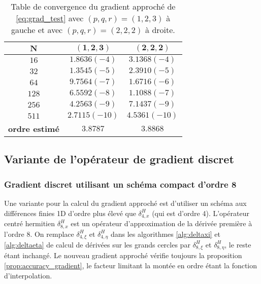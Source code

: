 \begin{table}[htbp]
\begin{center}
\begin{tabular}{|c||c|c|}
\hline
$\mathbf{N}$    & $\mathbf{(1,2,3)}$     & $\mathbf{(2,2,2)}$     \\
\hline
\hline
$16$   & $1.8636 (-4)$ & $3.1368 (-4)$ \\
$32$   & $1.3545 (-5)$ & $2.3910 (-5)$ \\
$64$   & $9.7564 (-7)$ & $1.6716 (-6)$ \\
$128$  & $6.5592 (-8)$ & $1.1088 (-7)$ \\
$256$  & $4.2563 (-9)$ & $7.1437 (-9)$ \\
$511$  & $2.7115(-10)$ & $4.5361(-10)$ \\
\hline
\hline
\textbf{ordre estimé} & $3.8787$ & $3.8868$ \\
\hline 
\end{tabular}
\end{center}
\caption{Table de convergence du gradient approché de \eqref{eq:grad_test} avec $(p,q,r)=(1,2,3)$ à gauche et avec $(p,q,r)=(2,2,2)$ à droite.}
\label{tab:rate_grad}
\end{table}















\subsection{Variante de l'opérateur de gradient discret}


\subsubsection{Gradient discret utilisant un schéma compact d'ordre 8}

Une variante pour la calcul du gradient approché est d'utiliser un schéma aux différences finies 1D d'ordre plus élevé que $\delta_{4,x}^H$ (qui est d'ordre 4). 
L'opérateur centré hermitien $\delta_{8,x}^H$ est un opérateur d'approximation de la dérivée première à l'ordre $8$.
On remplace $\delta_{4, \xi}^H$ et $\delta_{4, \eta}^H$ dans les algorithmes \ref{alg:deltaxi} et \ref{alg:deltaeta} de calcul de dérivées sur les grands cercles par $\delta_{8, \xi}^H$ et $\delta_{8, \eta}^H$, le reste étant inchangé. Le nouveau gradient approché vérifie toujours la proposition \ref{prop:accuracy_gradient}, le facteur limitant la montée en ordre étant la fonction d'interpolation.

